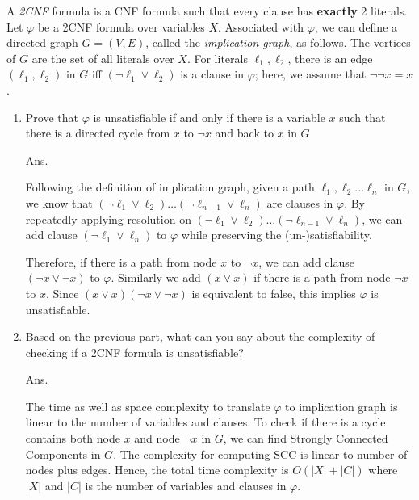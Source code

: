 \documentclass[11pt]{article}
\begin{document}
A \emph{2CNF} formula is a CNF formula such that every clause has {\bf
  exactly} 2 literals. Let $\varphi$ be a 2CNF formula over variables
$X$. Associated with $\varphi$, we can define a directed graph $G =
(V,E)$, called the \emph{implication graph}, as follows. The vertices
of $G$ are the set of all literals over $X$. For literals
$\ell_1,\ell_2$, there is an edge $(\ell_1,\ell_2)$ in $G$ iff $(\neg
\ell_1 \vee \ell_2)$ is a clause in $\varphi$; here, we assume that
$\neg \neg x = x$.
\begin{enumerate}
\item Prove that $\varphi$ is unsatisfiable if and only if there is a
  variable $x$ such that there is a directed cycle from $x$ to $\neg x$ and 
  back to $x$ in $G$

Ans.

Following the definition of implication graph,
given a path $\ell_1, \ell_2 \dotsc \ell_n$ in $G$,
we know that $(\neg \ell_1 \vee \ell_2)\dots(\neg \ell_{n-1} \vee \ell_n)$ are clauses in $\varphi$.
By repeatedly applying resolution on $(\neg \ell_1 \vee \ell_2)\dots(\neg \ell_{n-1} \vee \ell_n)$,
we can add clause $(\neg \ell_1 \vee \ell_n)$ to $\varphi$ while preserving the (un-)satisfiability.

Therefore, if there is a path from node $x$ to $\neg x$,
we can add clause $(\neg x \vee \neg x)$ to $\varphi$.
Similarly we add $(x \vee x)$ if there is a path from node $\neg x$ to $x$.
Since $(x \vee x)(\neg x \vee \neg x)$ is equivalent to false,
this implies $\varphi$ is unsatisfiable. 

\item Based on the previous part, what can you say about the
  complexity of checking if a 2CNF formula is unsatisfiable?
  
Ans.

The time as well as space complexity to translate $\varphi$ to implication graph is linear to the number of variables and clauses.
To check if there is a cycle contains both node $x$ and node $\neg x$ in $G$, we can find Strongly Connected Components in $G$.
The complexity for computing SCC is linear to number of nodes plus edges.
Hence, the total time complexity is $O(|X|+|C|)$ where $|X|$ and $|C|$ is the number of variables and clauses in $\varphi$.
\end{enumerate}
\end{document}
